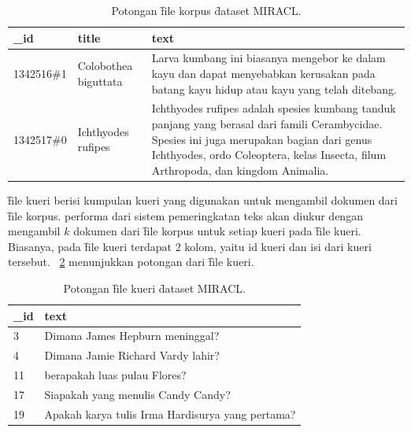     \begin{table}
        \centering
        \caption{Potongan \f{file} korpus \f{dataset} MIRACL.}
        \label{tab:contoh-file-korpus}
        \begin{tabular}{|l|l|p{}|}
            \hline
            \textbf{\_id}    & \textbf{title}             & \textbf{text}                                                                                                 \\ \hline
            1342516\#1  & Colobothea biguttata & Larva kumbang ini biasanya mengebor ke dalam kayu dan dapat menyebabkan kerusakan pada batang kayu hidup atau kayu yang telah ditebang. \\ \hline
            1342517\#0  & Ichthyodes rufipes  & Ichthyodes rufipes adalah spesies kumbang tanduk panjang yang berasal dari famili Cerambycidae. Spesies ini juga merupakan bagian dari genus Ichthyodes, ordo Coleoptera, kelas Insecta, filum Arthropoda, dan kingdom Animalia. \\ \hline
        \end{tabular}
    \end{table}

    \f{file} kueri berisi kumpulan kueri yang digunakan untuk mengambil dokumen dari \f{file} korpus. 
    performa dari sistem pemeringkatan teks akan diukur dengan mengambil $k$ dokumen dari \f{file} korpus untuk setiap kueri pada \f{file} kueri. Biasanya, pada \f{file} kueri terdapat 2 kolom, yaitu id kueri dan isi dari kueri tersebut. \tab~\ref{tab:query-file-example} menunjukkan potongan dari \f{file} kueri.

    \begin{table}
        \centering
        \caption{Potongan \f{file} kueri \f{dataset} MIRACL.}
        \label{tab:query-file-example}
        \begin{tabular}{|l|p{}|}
            \hline
            \textbf{\_id} & \textbf{text}                                                                 \\ \hline
            3             & Dimana James Hepburn meninggal?                                              \\ \hline
            4             & Dimana Jamie Richard Vardy lahir?                                            \\ \hline
            11            & berapakah luas pulau Flores?                                                 \\ \hline
            17            & Siapakah yang menulis Candy Candy?                                           \\ \hline
            19            & Apakah karya tulis Irma Hardisurya yang pertama?                              \\ \hline
        \end{tabular}
    \end{table}

